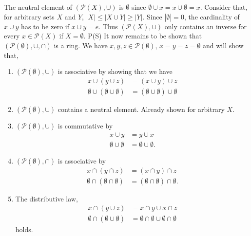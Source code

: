 \documentclass{article}
\begin{document}
The neutral element of $(\mathcal{P}(X), \cup)$ is $\emptyset$ since $\emptyset \cup x = x \cup \emptyset = x$. Consider that, for arbitrary sets $X$ and $Y$, $|X| \leq |X \cup Y| \geq |Y|$. Since $|\emptyset| = 0$, the cardinality of $x \cup y$ has to be zero if $x \cup y = e$. Thus $(\mathcal{P}(X), \cup)$ only contains an inverse for every $x \in \mathcal{P}(X)$ if $X = \emptyset$.
P(S)
It now remains to be shown that $(\mathcal{P}(\emptyset), \cup, \cap)$ is a ring. We have $x, y, z \in \mathcal{P}(\emptyset)$, $x = y = z = \emptyset$ and will show that,
\begin{enumerate}
    \item $(\mathcal{P}(\emptyset), \cup)$ is associative by showing that we have
    \begin{align*}
        x \cup (y \cup z) &= (x \cup y) \cup z \\
        \emptyset \cup (\emptyset \cup \emptyset) &= (\emptyset \cup \emptyset) \cup \emptyset
    \end{align*}
    
    \item $(\mathcal{P}(\emptyset), \cup)$ contains a neutral element. Already shown for arbitrary $X$.
    
    \item $(\mathcal{P}(\emptyset), \cup)$ is commutative by
    \begin{align*}
        x \cup y &= y \cup x \\
        \emptyset \cup \emptyset &= \emptyset \cup \emptyset.
    \end{align*}
    
    \item $(\mathcal{P}(\emptyset), \cap)$ is associative by
    \begin{align*}
        x \cap (y \cap z) &= (x \cap y) \cap z \\
        \emptyset \cap (\emptyset \cap \emptyset) &= (\emptyset \cap \emptyset) \cap \emptyset.
    \end{align*}

    \item The distributive law,
    \begin{align*}
        x \cap (y \cup z) &= x \cap y \cup x \cap z \\
        \emptyset \cap (\emptyset \cup \emptyset) &= \emptyset \cap \emptyset \cup \emptyset \cap \emptyset
    \end{align*}
    holds.
\end{enumerate}
\end{document}
